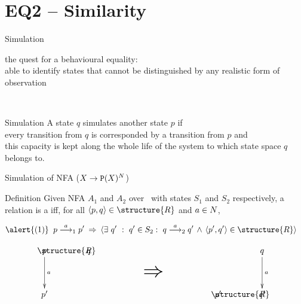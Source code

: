 \documentclass[aspectratio=169]{beamer}
\begin{document}
\section{EQ2 -- Similarity}

\begin{slide}{Simulation}
\begin{flushright}
the quest for a \alert{behavioural equality}:\\
able to identify states that cannot be distinguished by any \alert{realistic} form of  observation
\end{flushright}
~\\

\small
\begin{block}{Simulation}
{A state $q$ \alert{simulates} another state $p$
\alert{if}\\
every transition from $q$ is corresponded by a transition from $p$
\alert{and}\\
this capacity is kept along the whole life of the system to which state space $q$ belongs to.}
\end{block}
\end{slide}

\begin{slide}{Simulation of NFA ($X \to \mathtt{P}(X)^{N}$)}
\small

\begin{block}{Definition}
Given NFA $A_1$ and $A_2$ over \Act\ with states $S_1$ and $S_2$ respectively,
a relation  is a  iff,
for all $\pair{p,q} \in \structure{R}$ and $a \in N$,

\begin{align*}
\text{\alert{(1)}}\; \;  & p \rtran{a}_1 p'\;  \imp\; \rcb{\exists}{q'}{q' \in S_2}{q \rtran{a}_2 q'\, \land\, \pair{p',q'} \in \structure{R}}   
\end{align*}
\vspace{0mm}

\begin{equation*}
\xymatrix{
p \ar[d]^-{a} & \hspace{-1.5cm} \structure{R}  & \hspace{-2.7cm} q 
  & \!\! \text{\raisebox{-10mm}{\Huge $\imp$}} \! \! &  &  &  q \ar[d]^-{a} \\
p'           &   &           &                                   & p'\hspace{-2.7cm} &  \structure{R} \hspace{-1.5cm} &  q'
}
\end{equation*}

\end{block}
\end{slide}
\end{document}
